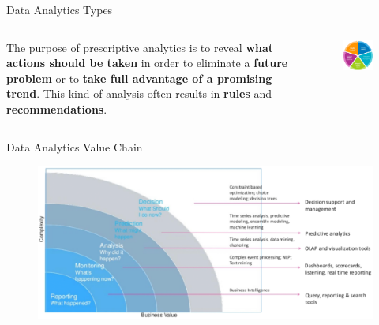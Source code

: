 \documentclass[main.tex]{subfiles}
\begin{document}
\begin{frame}{Data Analytics Types}
\begin{columns}
\begin{column}{.6\textwidth}
\begin{justify}
                    The purpose of prescriptive analytics is to reveal \textbf{what actions should be taken} in order to eliminate a \textbf{future problem} or to \textbf{take full advantage of a promising trend}. This kind of analysis often results in \textbf{rules} and \textbf{recommendations}.
                \end{justify}
            \end{column}
            \begin{column}{.4\textwidth}
                \begin{figure}
                    \label{fig:data-analytics-types}
                    \includegraphics[width=.9\textwidth]{figures/external/data-analytics-types.png}
                \end{figure}
            \end{column}
        \end{columns}
    \end{frame}
    
    \begin{frame}{Data Analytics Value Chain}
        \begin{figure}
            \label{fig:data-analytics-value-chain}
            \includegraphics[width=\textwidth]{figures/external/analytics-value-chain.png}
        \end{figure}
    \end{frame}
    
\end{document}
